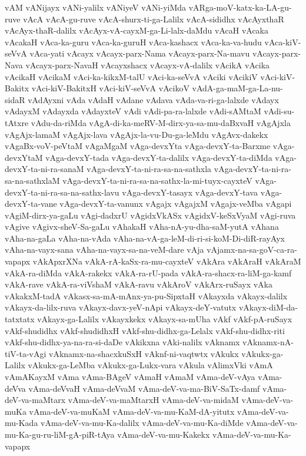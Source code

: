{vAM
vANijayx
vANi-yalilx
vANiyeV
vANi-yiMda
vARga-moV-katx-ka-LA-gu-ruve
vAcA
vAcA-gu-ruve
vAcA-shurx-ti-ga-Lalilx
vAcA-sididhx
vAcAyxthaR
vAcAyx-thaR-dalilx
vAcAyx-vA-cayxM-ga-Li-lalx-daMdu
vAcaH
vAcaka
vAcakaH
vAca-ka-guru
vAca-ka-guruH
vAca-kashacx
vAca-ka-va-hudu
vAca-kiV-seVvA
vAca-yati
vAcayx
vAcayx-parx-Nama
vAcayx-parx-Na-mavu
vAcayx-parx-Nava
vAcayx-parx-NavaH
vAcayxshacx
vAcayx-vA-dalilx
vAcikA
vAcika
vAcikaH
vAcikaM
vAci-ka-kikxM-talU
vAci-ka-seVvA
vAciki
vAcikiV
vAci-kiV-Bakitx
vAci-kiV-BakitxH
vAci-kiV-seVvA
vAcikoV
vAdA-ga-maM-ga-La-nu-sidaR
vAdAyxni
vAda
vAdaH
vAdane
vAdava
vAda-va-ri-ga-lalxde
vAdayx
vAdayxM
vAdayxda
vAdayxteV
vAdi
vAdi-pa-ra-lalxde
vAdi-sAMtaM
vAdi-su-tAtxre
vAdu-da-riMda
vAgA-di-ka-meRV-M-dirx-ya-sa-mu-daBxvaH
vAgAjxla
vAgAjx-lamaM
vAgAjx-lava
vAgAjx-la-vu-Du-ga-leMdu
vAgAvx-dakekx
vAgaBx-voV-peVtaM
vAgaMgaM
vAga-devxYta
vAga-devxY-ta-Barxme
vAga-devxYtaM
vAga-devxY-tada
vAga-devxY-ta-dalilx
vAga-devxY-ta-diMda
vAga-devxY-ta-ni-ra-sanaM
vAga-devxY-ta-ni-ra-sa-na-sathxla
vAga-devxY-ta-ni-ra-sa-na-sathxlaM
vAga-devxY-ta-ni-ra-sa-na-sathx-la-mi-tuyx-cayxteV
vAga-devxY-ta-ni-ra-sa-na-sathx-lavu
vAga-devxY-tasayx
vAga-devxY-tava
vAga-devxY-ta-vane
vAga-devxY-ta-vanunx
vAgajx
vAgajxM
vAgajx-veMba
vAgapi
vAgiM-dirx-ya-gaLu
vAgi-dadxrU
vAgidxVkASx
vAgidxV-keSxVyaM
vAgi-ruva
vAgive
vAgivx-sheV-Sa-gaLu
vAhakaH
vAha-nA-yu-dha-saM-yutA
vAhana
vAha-na-gaLa
vAha-na-vAda
vAha-na-vA-ga-leM-di-ri-si-koM-Di-diR-rayAyx
vAha-na-vayx-sana
vAha-na-vayx-sa-na-veM-dare
vAja
vAjamx-na-sa-goV-ca-ra-vapapx
vAkApxrXNa
vAkA-rA-kaSx-ra-mu-cayxteV
vAkAra
vAkAraH
vAkAraM
vAkA-ra-diMda
vAkA-rakekx
vAkA-ra-rU-pada
vAkA-ra-shacx-ra-liM-ga-kamf
vAkA-rave
vAkA-ra-viVshaM
vAkA-ravu
vAkAroV
vAkArx-ruSayx
vAka
vAkakxM-tadA
vAkasx-sa-mA-mAnx-ya-pu-SipxtaH
vAkayxda
vAkayx-dalilx
vAkayx-da-lilx-ruva
vAkayx-davx-yeV-nApi
vAkayx-deY-vatutx
vAkayx-diM-da-tatxtatx
vAkayx-ga-Lalilx
vAkayxkekx
vAkayx-sa-mUha
vAkf
vAkf-pA-ruSayx
vAkf-shudidhx
vAkf-shudidhxH
vAkf-shu-didhx-ga-Lelalx
vAkf-shu-didhx-riti
vAkf-shu-didhx-ya-na-ra-si-daDe
vAkikxna
vAki-nalilx
vAknamx
vAknamx-nA-tiV-ta-vAgi
vAknamx-na-shacxkuSxH
vAknf-ni-vaqtwtx
vAkukx
vAkukx-ga-Lalilx
vAkukx-ga-LeMba
vAkukx-ga-Lukx-vara
vAkula
vAlimxVki
vAmA
vAmAKayxM
vAma
vAma-BAgeV
vAmaH
vAmaM
vAma-deV-vAya
vAma-deVva
vAma-deVvaH
vAma-deVvaM
vAma-deV-va-ma-BiV-SaTx-damf
vAma-deV-va-maMtarx
vAma-deV-va-maMtarxH
vAma-deV-va-midaM
vAma-deV-va-muKa
vAma-deV-va-muKaM
vAma-deV-va-mu-KaM-dA-yitutx
vAma-deV-va-mu-Kada
vAma-deV-va-mu-Ka-dalilx
vAma-deV-va-mu-Ka-diMde
vAma-deV-va-mu-Ka-gu-ru-liM-gA-piR-tAya
vAma-deV-va-mu-Kakekx
vAma-deV-va-mu-Ka-vapapx
}
